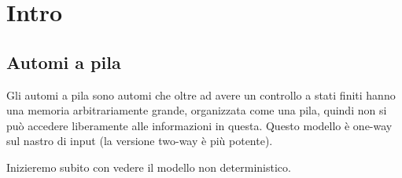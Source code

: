 \documentclass[12pt]{report}
\begin{document}
\tableofcontents
\newpage

\chapter{Intro}
\section{Automi a pila}
Gli automi a pila sono automi che oltre ad avere un controllo a stati finiti hanno una memoria arbitrariamente grande, organizzata come una pila, quindi non si può accedere liberamente alle informazioni in questa.
Questo modello è one-way sul nastro di input (la versione two-way è più potente).

Inizieremo subito con vedere il modello non deterministico.
\end{document}
